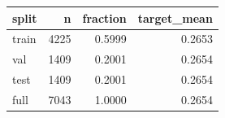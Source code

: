 \begin{tabular}{lrrr}
\toprule
split & n & fraction & target\_mean \\
\midrule
train & 4225 & 0.5999 & 0.2653 \\
val & 1409 & 0.2001 & 0.2654 \\
test & 1409 & 0.2001 & 0.2654 \\
full & 7043 & 1.0000 & 0.2654 \\
\bottomrule
\end{tabular}
